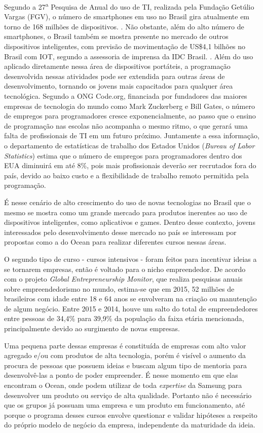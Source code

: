 Segundo a 27\textsuperscript{a} Pesquisa de Anual do uso de TI, realizada pela Fundação Getúlio Vargas (FGV), o número de smartphones em uso no Brasil gira atualmente em torno de 168 milhões de dispositivos. \cite{tifgv}. Não obstante, além do alto número de smartphones, o Brasil também se mostra presente no mercado de outros dispositivos inteligentes, com previsão de movimentação de US\$4,1 bilhões no Brasil com IOT, segundo a assessoria de imprensa da IDC Brasil. \cite{idc}. Além do uso aplicado diretamente nessa área de dispositivos portáteis, a programação desenvolvida nessas atividades pode ser extendida para outras áreas de desenvolvimento, tornando os jovens mais capacitados para qualquer área tecnológica. Segundo a ONG Code.org, financiada por fundadores das maiores empresas de tecnologia do mundo como Mark Zuckerberg e Bill Gates, o número de empregos para programadores cresce exponencialmente, ao passo que o ensino de programação nas escolas não acompanha o mesmo ritmo, o que gerará uma falta de profissionais de TI em um futuro próximo. Juntamente a essa informação, o departamento de estatísticas de trabalho dos Estados Unidos (\textit{Bureau of Labor Statistics}) estima que o número de empregos para programadores dentro dos EUA diminuirá em até 8\%, pois mais profissionais deverão ser recrutados fora do país, devido ao baixo custo e a flexibilidade de trabalho remoto permitida pela programação. \cite{bls}

É nesse cenário de alto crescimento do uso de novas tecnologias no Brasil que o mesmo se mostra como um grande mercado para produtos inerentes ao uso de dispositivos inteligentes, como aplicativos e games. Dentro desse contexto, jovens interessados pelo desenvolvimento desse mercado no país se interessam por propostas como a do Ocean para realizar diferentes cursos nessas áreas.
 
O segundo tipo de curso - cursos intensivos - foram feitos para incentivar ideias a se tornarem empresas, então é voltado para o nicho empreendedor. De acordo com o projeto \textit{Global Entrepreneurship Monitor}, que realiza pesquisas anuais sobre empreendedorismo no mundo, estima-se que em 2015, 52 milhões de brasileiros com idade entre 18 e 64 anos se envolveram na criação ou manutenção de algum negócio. Entre 2015 e 2014, houve um salto do total de empreendedores entre pessoas de 34,4\% para 39,9\% da população da faixa etária mencionada, principalmente devido ao surgimento de novas empresas. \cite{GEM}

Uma pequena parte dessas empresas é constituída de empresas com alto valor agregado e/ou com produtos de alta tecnologia, porém é visível o aumento da procura de pessoas que possuem ideias e buscam algum tipo de mentoria para desenvolvê-las a ponto de poder empreender. É nesse momento em que elas encontram o Ocean, onde podem utilizar de toda \textit{expertise} da Samsung para desenvolver um produto ou serviço de alta qualidade. Portanto não é necessário que os grupos já possuam uma empresa e um produto em funcionamento, até porque o programa desses cursos envolve questionar e validar hipóteses a respeito do próprio modelo de negócio da empresa, independente da maturidade da ideia. 

